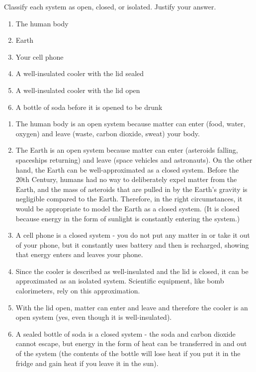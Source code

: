 \begin{Exercise}[title = {Open, Closed, and Isolated Systems}, label = systems]
Classify each system as open, closed, or isolated. Justify your answer. 
\begin{enumerate}
\item The human body
\item Earth
\item Your cell phone
\item A well-insulated cooler with the lid sealed
\item A well-insulated cooler with the lid open
\item A bottle of soda before it is opened to be drunk
\end{enumerate}
\end{Exercise}

\begin{Answer}[ref = systems]
\begin{enumerate}
\item The human body is an open system because matter can enter (food, water, 
oxygen) and leave (waste, carbon dioxide, sweat) your body.
\item The Earth is an open system because matter can enter (asteroids falling, 
spaceships returning) and leave (space vehicles and astronauts). On the other 
hand, the Earth can be well-approximated as a closed system. Before the 20th 
Century, humans had no way to deliberately expel matter from the Earth, and the 
mass of asteroids that are pulled in by the Earth's gravity is negligible 
compared to the Earth. Therefore, in the right circumstances, it would be 
appropriate to model the Earth as a closed system. (It is closed because 
energy in the form of sunlight is constantly entering the system.)
\item A cell phone is a closed system - you do not put any matter in or take it 
out of your phone, but it constantly uses battery and then is recharged, showing
that energy enters and leaves your phone. 
\item Since the cooler is described as well-insulated and the lid is closed, it 
can be approximated as an isolated system. Scientific equipment, like bomb 
calorimeters, rely on this approximation. 
\item With the lid open, matter can enter and leave and therefore the cooler is 
an open system (yes, even though it is well-insulated). 
\item A sealed bottle of soda is a closed system - the soda and carbon dioxide 
cannot escape, but energy in the form of heat can be transferred in and out of 
the system (the contents of the bottle will lose heat if you put it in the 
fridge and gain heat if you leave it in the sun).
\end{enumerate}
\end{Answer}


